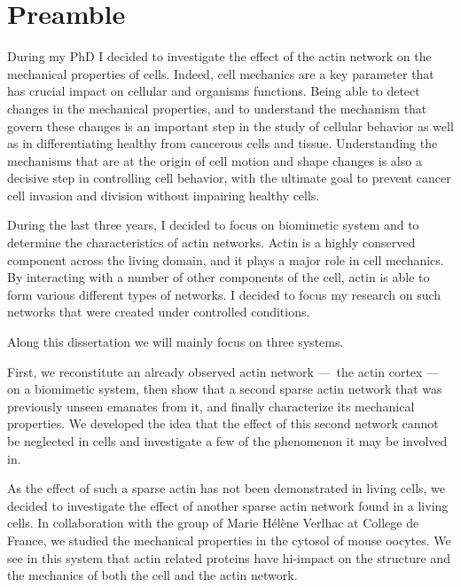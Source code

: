 \documentclass[A4paperpaper,11pt,english]{sphinxmanual}
\begin{document}
\label{index-latex::doc}



\chapter*{Preamble}
\label{index-latex:preamble}\label{index-latex::doc}\label{index-latex:contents}
During my PhD I decided to investigate the effect of the actin network on the
mechanical properties of cells. Indeed, cell mechanics are a key parameter that
has crucial impact on cellular and organisms functions. Being able to detect
changes in the mechanical properties, and to understand the mechanism that
govern these changes  is an important step in the study of cellular behavior as
well as in differentiating healthy from cancerous cells and tissue.
Understanding the mechanisms that are at the origin of cell motion and shape
changes is also a decisive step in controlling cell behavior, with the ultimate
goal to prevent cancer cell invasion and division without impairing healthy
cells.

During the last three years, I decided to focus on biomimetic system and
to determine the characteristics of actin networks. Actin is a highly conserved
component across the living domain, and it plays a major role in cell
mechanics. By interacting with a number of other components of the cell, actin
is able to form various different types of networks. I decided to focus my research on such networks that were created under
controlled conditions.

Along this dissertation we will mainly focus on three systems.

First, we reconstitute an already observed actin network — the actin
cortex — on a biomimetic system, then show that a
second sparse actin network that was previously unseen emanates from it, and finally characterize its mechanical
properties. We developed the idea that the effect of this second network cannot
be neglected in cells and investigate a few of the phenomenon it may be involved
in.

As the effect of such a sparse actin has not been demonstrated in living cells, we decided to
investigate the effect of another sparse actin network found in a living cells. In
collaboration with the group of Marie Hélène Verlhac at College de France, we studied the mechanical properties
in the cytosol of mouse oocytes. We see in this system that actin related proteins have
hi-impact on the structure and the mechanics of both the cell and the actin
network.
\end{document}

